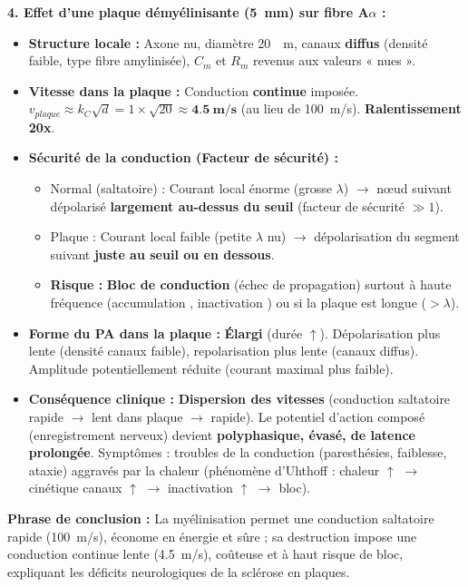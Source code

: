 \documentclass[11pt]{article}
\begin{document}
\begin{exoresolu}
\textbf{4. Effet d'une plaque démyélinisante (\SI{5}{mm}) sur fibre A$\alpha$ :}
\begin{itemize}
    \item \textbf{Structure locale :} Axone nu, diamètre \SI{20}{\mu m}, canaux  \textbf{diffus} (densité faible, type fibre amylinisée), $C_m$ et $R_m$ revenus aux valeurs « nues ».
    \item \textbf{Vitesse dans la plaque :} Conduction \textbf{continue} imposée. $v_{plaque} \approx k_C \sqrt{d} = 1 \times \sqrt{20} \approx \mathbf{\SI{4,5}{m/s}}$ (au lieu de \SI{100}{m/s}). \textbf{Ralentissement 20x}.
    \item \textbf{Sécurité de la conduction (Facteur de sécurité) :}
    \begin{itemize}
        \item Normal (saltatoire) : Courant local énorme (grosse $\lambda$) $\rightarrow$ nœud suivant dépolarisé \textbf{largement au-dessus du seuil} (facteur de sécurité $\gg 1$).
        \item Plaque : Courant local faible (petite $\lambda$ nu) $\rightarrow$ dépolarisation du segment suivant \textbf{juste au seuil ou en dessous}.
        \item \textbf{Risque :} \textbf{Bloc de conduction} (échec de propagation) surtout à haute fréquence (accumulation , inactivation ) ou si la plaque est longue ($> \lambda$).
    \end{itemize}
    \item \textbf{Forme du PA dans la plaque :} \textbf{Élargi} (durée $\uparrow$). Dépolarisation plus lente (densité canaux  faible), repolarisation plus lente (canaux  diffus). Amplitude potentiellement réduite (courant  maximal plus faible).
    \item \textbf{Conséquence clinique :} \textbf{Dispersion des vitesses} (conduction saltatoire rapide $\to$ lent dans plaque $\to$ rapide). Le potentiel d'action composé (enregistrement nerveux) devient \textbf{polyphasique, évasé, de latence prolongée}. Symptômes : troubles de la conduction (paresthésies, faiblesse, ataxie) aggravés par la chaleur (phénomène d'Uhthoff : chaleur $\uparrow$ $\rightarrow$ cinétique canaux $\uparrow$ $\rightarrow$ inactivation $\uparrow$ $\rightarrow$ bloc).
\end{itemize}

\textbf{Phrase de conclusion :} La myélinisation permet une conduction saltatoire rapide (\SI{100}{m/s}), économe en énergie et sûre ; sa destruction impose une conduction continue lente (\SI{4,5}{m/s}), coûteuse et à haut risque de bloc, expliquant les déficits neurologiques de la sclérose en plaques.
\end{exoresolu}
\end{document}
